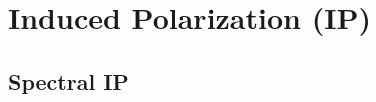\section{Induced Polarization (IP)}\label{sub:crmod_ip}
\subsection{Spectral IP}\label{sub:crmod_sip}
